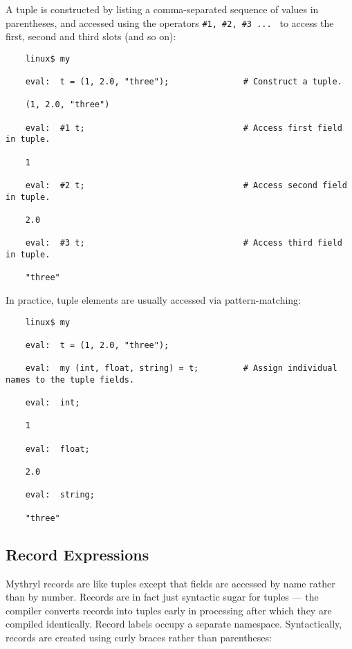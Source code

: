 A tuple is constructed by listing a comma-separated sequence of 
values in parentheses, and accessed using the operators {\tt \#1, \#2, \#3 ... } 
to access the first, second and third slots (and so on):

\begin{verbatim}
    linux$ my

    eval:  t = (1, 2.0, "three");               # Construct a tuple.

    (1, 2.0, "three")

    eval:  #1 t;                                # Access first field in tuple.

    1

    eval:  #2 t;                                # Access second field in tuple.

    2.0

    eval:  #3 t;                                # Access third field in tuple.

    "three"
\end{verbatim}

In practice, tuple elements are usually accessed via pattern-matching:

\begin{verbatim}
    linux$ my

    eval:  t = (1, 2.0, "three");

    eval:  my (int, float, string) = t;         # Assign individual names to the tuple fields.

    eval:  int;

    1

    eval:  float;

    2.0

    eval:  string;

    "three"

\end{verbatim}

\cutend*

\subsection{Record Expressions}
\label{section:ref:expressions:record-expressions}

Mythryl records are like tuples except that fields are 
accessed by name rather than by number.  Records are 
in fact just syntactic sugar for tuples --- the compiler 
converts records into tuples early in processing after 
which they are compiled identically.  Record labels 
occupy a separate namespace.  Syntactically, records 
are created using curly braces rather than parentheses:

